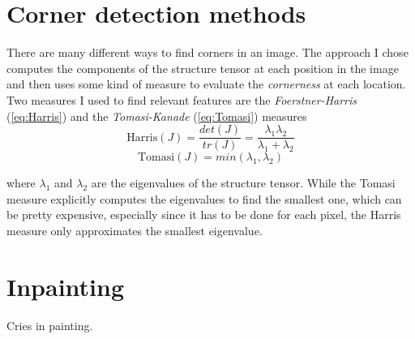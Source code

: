 \section{Corner detection methods}


There are many different ways to find corners in an image. The approach I chose 
computes the components of the structure tensor at each position in the image and then uses some kind
of measure to evaluate the \textit{cornerness} at each location.
Two measures I used to find relevant features are the \textit{Foerstner-Harris} (\ref{eq:Harris}) and the \textit{Tomasi-Kanade} (\ref{eq:Tomasi}) measures
\begin{equation}\label{eq:Harris}
    \text{Harris}(J) = \frac{det(J)}{tr(J)} = \frac{\lambda_1\lambda_2}{\lambda_1 + \lambda_2}
\end{equation}
\begin{equation}\label{eq:Tomasi}
    \text{Tomasi}(J) = min(\lambda_1, \lambda_2)
\end{equation}

where $\lambda_1$ and $\lambda_2$ are the eigenvalues of the structure tensor.
While the Tomasi measure explicitly computes the eigenvalues to find the smallest one, which can be
pretty expensive, especially since it has to be done for each pixel, the Harris measure only
approximates the smallest eigenvalue. 


\section{Inpainting}

Cries in painting.
